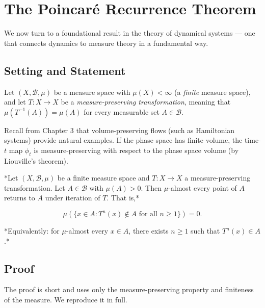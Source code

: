 \section{The Poincaré Recurrence Theorem}\label{sec:4.4}

We now turn to a foundational result in the theory of dynamical systems --- one that connects dynamics to measure theory in a fundamental way.

\subsection{Setting and Statement}\label{sec:4.4.1}

Let $(X, \mathcal{B}, \mu)$ be a measure space with $\mu(X) < \infty$ (a \textit{finite} measure space), and let $T: X \to X$ be a \textit{measure-preserving transformation}, meaning that $\mu(T^{-1}(A)) = \mu(A)$ for every measurable set $A \in \mathcal{B}$.

Recall from Chapter 3 that volume-preserving flows (such as Hamiltonian systems) provide natural examples. If the phase space has finite volume, the time-$t$ map $\phi_t$ is measure-preserving with respect to the phase space volume (by Liouville's theorem).

\begin{theorem}\label{thm:4.7}
*Let $(X, \mathcal{B}, \mu)$ be a finite measure space and $T: X \to X$ a measure-preserving transformation. Let $A \in \mathcal{B}$ with $\mu(A) > 0$. Then $\mu$-almost every point of $A$ returns to $A$ under iteration of $T$. That is,*

\[
\mu\!\left(\{x \in A : T^n(x) \notin A \text{ for all } n \geq 1\}\right) = 0.
\]

*Equivalently: for $\mu$-almost every $x \in A$, there exists $n \geq 1$ such that $T^n(x) \in A$.*
\end{theorem}


\subsection{Proof}\label{sec:4.4.2}

The proof is short and uses only the measure-preserving property and finiteness of the measure. We reproduce it in full.

